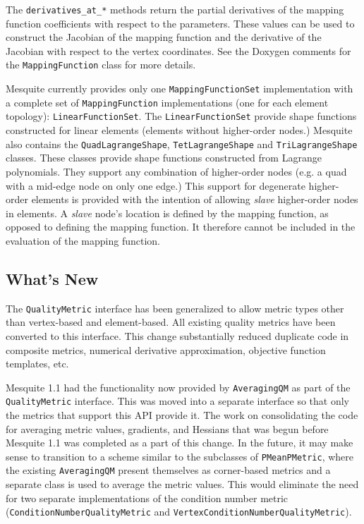 \documentclass{article}
\begin{document}
The \texttt{derivatives\_at\_*} methods return the partial derivatives of the mapping function coefficients with respect to the parameters.  These values can be used to construct the Jacobian of the mapping function and the derivative of the Jacobian with respect to the vertex coordinates.  See the Doxygen comments for the \texttt{MappingFunction} class for more details.

Mesquite currently provides only one \texttt{MappingFunctionSet} implementation with a complete set of \texttt{MappingFunction} implementations (one for each element topology): \texttt{LinearFunctionSet}.  The \texttt{LinearFunctionSet} provide shape functions constructed for linear elements (elements without higher-order nodes.)  Mesquite also contains the \texttt{QuadLagrangeShape}, \texttt{TetLagrangeShape} and \texttt{TriLagrangeShape} classes.  These classes provide shape functions constructed from Lagrange polynomials.  They support any combination of higher-order nodes (e.g. a quad with a mid-edge node on only one edge.)  This support for degenerate higher-order elements is provided with the intention of allowing \emph{slave} higher-order nodes in elements.  A \emph{slave} node's location is defined by the mapping function, as opposed to defining the mapping function.  It therefore cannot be included in the evaluation of the mapping function.


\subsection{What's New}

The \texttt{QualityMetric} interface has been generalized to allow metric types other than vertex-based and element-based.  All existing quality metrics have been converted to this interface.  This change substantially reduced duplicate code in composite metrics, numerical derivative approximation, objective function templates, etc.

Mesquite 1.1 had the functionality now provided by \texttt{AveragingQM} as part of the \texttt{QualityMetric} interface.  This was moved into a separate interface so that only the metrics that support this API provide it.  The work on consolidating the code for averaging metric values, gradients, and Hessians that was begun before Mesquite 1.1 was completed as a part of this change.  In the future, it may make sense to transition to a scheme similar to the subclasses of \texttt{PMeanPMetric}, where the existing \texttt{AveragingQM} present themselves as corner-based metrics and a separate class is used to average the metric values.  This would eliminate the need for two separate implementations of the condition number metric (\texttt{ConditionNumberQualityMetric} and \texttt{VertexConditionNumberQualityMetric}).
\end{document}
